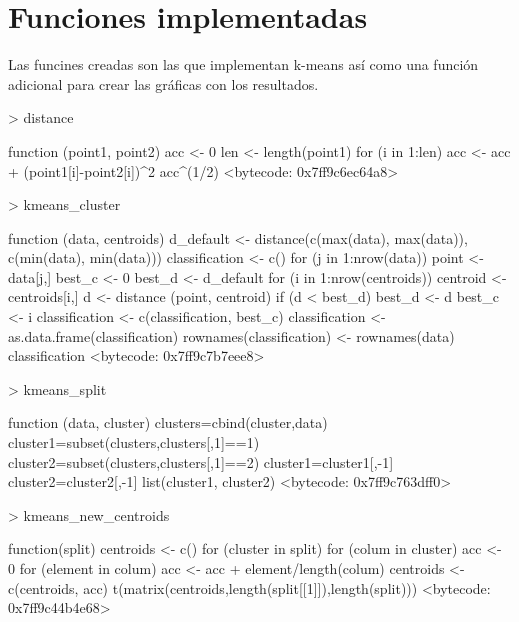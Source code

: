 \documentclass [a4paper] {article}
\begin{document}
\newpage
\section{Funciones implementadas}
Las funcines creadas son las que implementan k-means así como una función adicional para crear las gráficas con los resultados.
\begin{Schunk}
\begin{Sinput}
> distance
\end{Sinput}
\begin{Soutput}
function (point1, point2) {
  acc <- 0
  len <- length(point1)
  for (i in 1:len){
    acc <- acc + (point1[i]-point2[i])^2
  }
  acc^(1/2)
}
<bytecode: 0x7ff9c6ec64a8>
\end{Soutput}
\begin{Sinput}
> kmeans_cluster
\end{Sinput}
\begin{Soutput}
function (data, centroids) {
  d_default <- distance(c(max(data), max(data)), c(min(data), min(data)))
  classification <- c()
  for (j in 1:nrow(data)){
      point <- data[j,]
      best_c <- 0
      best_d <- d_default
      for (i in 1:nrow(centroids)){
        centroid <- centroids[i,]
        d <- distance (point, centroid)
        if (d < best_d){
          best_d <- d
          best_c <- i
        }
    }
    classification <- c(classification, best_c)
  }
  classification <- as.data.frame(classification)
  rownames(classification) <- rownames(data)
  classification
}
<bytecode: 0x7ff9c7b7eee8>
\end{Soutput}
\begin{Sinput}
> kmeans_split
\end{Sinput}
\begin{Soutput}
function (data, cluster) {
  clusters=cbind(cluster,data)
  cluster1=subset(clusters,clusters[,1]==1)
  cluster2=subset(clusters,clusters[,1]==2)
  cluster1=cluster1[,-1]
  cluster2=cluster2[,-1]
  list(cluster1, cluster2)
}
<bytecode: 0x7ff9c763dff0>
\end{Soutput}
\begin{Sinput}
> kmeans_new_centroids
\end{Sinput}
\begin{Soutput}
function(split){
  centroids <- c()
  for (cluster in split) {
    for (colum in cluster) {
      acc <- 0
      for (element in colum){
        acc <- acc + element/length(colum)
      }
      centroids <- c(centroids, acc)
    }
  }
  t(matrix(centroids,length(split[[1]]),length(split)))
}
<bytecode: 0x7ff9c44b4e68>

\end{Soutput}
\end{Schunk}
\end{document}
